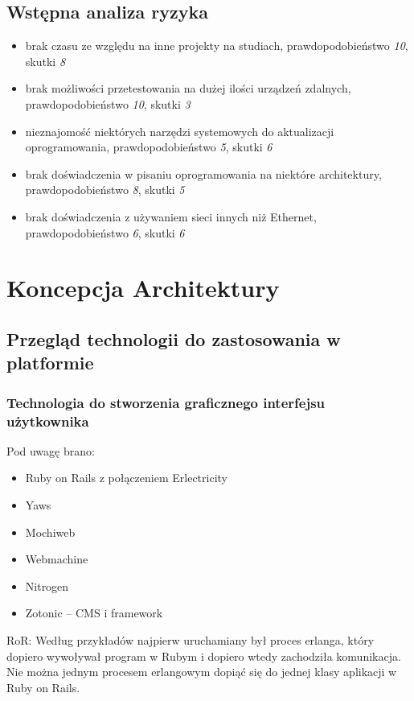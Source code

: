 \documentclass[polish,12pt]{aghthesis}
\begin{document}
\subsection{Wstępna analiza ryzyka}
\begin{itemize}
\item brak czasu ze względu na inne projekty na studiach, prawdopodobieństwo \emph{10}, skutki \emph{8}
\item brak możliwości przetestowania na dużej ilości urządzeń zdalnych, prawdopodobieństwo \emph{10}, skutki \emph{3}
\item nieznajomość niektórych narzędzi systemowych do aktualizacji oprogramowania, prawdopodobieństwo \emph{5}, skutki \emph{6}
\item brak doświadczenia w pisaniu oprogramowania na niektóre architektury, prawdopodobieństwo \emph{8}, skutki \emph{5}
\item brak doświadczenia z używaniem sieci innych niż Ethernet, prawdopodobieństwo \emph{6}, skutki \emph{6}
\end{itemize}

\section{Koncepcja Architektury}
\subsection{Przegląd technologii do zastosowania w platformie}
\subsubsection{Technologia do stworzenia graficznego interfejsu użytkownika}
Pod uwagę brano:
\begin{itemize}
\item Ruby on Rails z połączeniem Erlectricity
\item Yaws
\item Mochiweb
\item Webmachine
\item Nitrogen
\item Zotonic – CMS i framework
\end{itemize}

RoR: Według przykładów najpierw uruchamiany był proces erlanga, który dopiero wywoływał program w Rubym i dopiero wtedy zachodziła komunikacja. Nie można jednym procesem erlangowym dopiąć się do jednej klasy aplikacji w Ruby on Rails.
\end{document}
